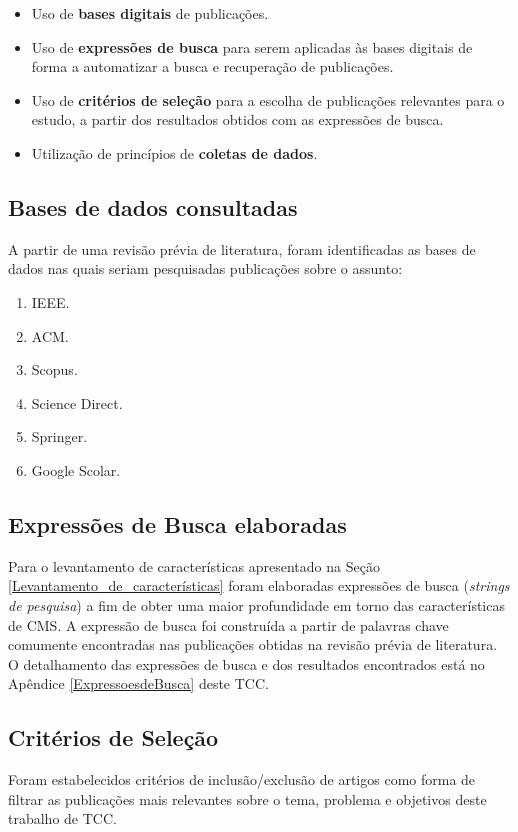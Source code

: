  \begin{itemize}
\item Uso de \textbf{bases digitais} de publicações.
\item Uso de \textbf{expressões de busca} para serem aplicadas às bases digitais de forma a automatizar a busca e recuperação de publicações.
\item Uso de \textbf{critérios de seleção} para a escolha de publicações relevantes para o estudo, a partir dos resultados obtidos com as expressões de busca.
\item Utilização de princípios de \textbf{coletas de dados}.

 \end{itemize}    

\subsection{Bases de dados consultadas}
\label{bases_de_dados}
A partir de uma  revisão prévia de literatura, foram identificadas as bases de dados nas quais seriam pesquisadas publicações
sobre o assunto:

\begin{enumerate}
\item IEEE.
\item ACM.
\item Scopus.
\item Science Direct.
\item Springer.
\item Google Scolar.
\end{enumerate}	

\subsection{Expressões de Busca elaboradas}
\label{String_Pesquisa}
Para o levantamento de características apresentado na Seção \ref{Levantamento_de_características} foram elaboradas expressões de busca (\textit{strings de pesquisa}) a fim de obter uma maior profundidade em torno das características de CMS. A expressão de busca foi construída a partir de palavras chave comumente encontradas nas publicações obtidas na revisão prévia de literatura. O detalhamento das expressões de busca e dos resultados encontrados está no Apêndice \ref{ExpressoesdeBusca} deste TCC.

\subsection{Critérios de Seleção}
\label{Criterios_selecao}
Foram estabelecidos critérios de inclusão/exclusão de artigos como forma de filtrar as publicações mais relevantes sobre o tema, problema e objetivos deste trabalho de TCC. 

